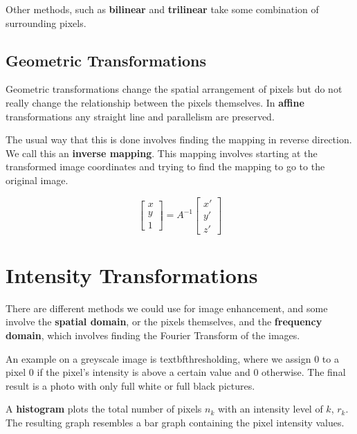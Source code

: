 \documentclass{tufte-handout}
\begin{document}
Other methods, such as \textbf{bilinear} and \textbf{trilinear} take some combination
of surrounding pixels.

\subsection{Geometric Transformations}
Geometric transformations change the spatial arrangement of pixels but do not really
change the relationship between the pixels themselves. In \textbf{affine} 
transformations any straight line and parallelism are preserved.

The usual way that this is done involves finding the mapping in reverse direction.
We call this an \textbf{inverse mapping}. This mapping involves starting at the transformed
image coordinates and trying to find the mapping to go to the original image.

\[ 
	\begin{bmatrix}	
	x \\
	y \\
	1
	\end{bmatrix}
= A^{-1}
	\begin{bmatrix}
	x' \\
	y' \\
	z' 
	\end{bmatrix}
\]

\section{Intensity Transformations}
There are different methods we could use for image enhancement, and some involve the 
\textbf{spatial domain}, or the pixels themselves, and the \textbf{frequency domain},
which involves finding the Fourier Transform of the images.

An example on a greyscale image is textbf{thresholding}, where we assign 0 to a pixel
$0$ if the pixel's intensity is above a certain value and 0 otherwise. The final result
is a photo with only full white or full black pictures.

A \textbf{histogram} plots the total number of pixels $n_{k}$ with an intensity level
of $k$, $r_{k}$. The resulting graph resembles a bar graph containing the pixel 
intensity values.
\end{document}
